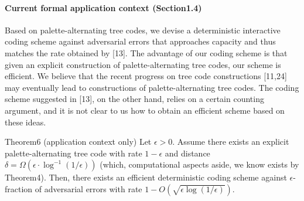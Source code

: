 \paragraph{Current formal application context (Section1.4)}
Based on palette-alternating tree codes, we devise a deterministic interactive coding scheme against adversarial errors that approaches capacity and thus matches the rate obtained by [13]. The advantage of our coding scheme is that given an explicit construction of palette-alternating tree codes, our scheme is efficient. We believe that the recent progress on tree code constructions [11,24] may eventually lead to constructions of palette-alternating tree codes. The coding scheme suggested in [13], on the other hand, relies on a certain counting argument, and it is not clear to us how to obtain an efficient scheme based on these ideas.
\begin{authorclaim}{Theorem6 (application context only)}
Let $\epsilon>0$. Assume there exists an explicit palette-alternating tree code with rate $1-\epsilon$ and distance $\delta=\Omega(\epsilon\cdot\log^{-1}(1/\epsilon))$ (which, computational aspects aside, we know exists by Theorem4). Then, there exists an efficient deterministic coding scheme against $\epsilon$-fraction of adversarial errors with rate $1-O(\sqrt{\epsilon\log(1/\epsilon)})$.
\end{authorclaim}

